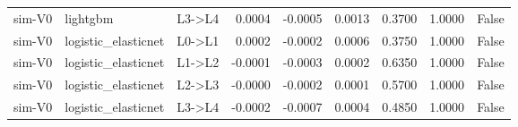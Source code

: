 \begin{table}
\begin{tabular}{lllrrrrrr}
sim-V0 & lightgbm & L3->L4 & 0.0004 & -0.0005 & 0.0013 & 0.3700 & 1.0000 & False \\
sim-V0 & logistic\_elasticnet & L0->L1 & 0.0002 & -0.0002 & 0.0006 & 0.3750 & 1.0000 & False \\
sim-V0 & logistic\_elasticnet & L1->L2 & -0.0001 & -0.0003 & 0.0002 & 0.6350 & 1.0000 & False \\
sim-V0 & logistic\_elasticnet & L2->L3 & -0.0000 & -0.0002 & 0.0001 & 0.5700 & 1.0000 & False \\
sim-V0 & logistic\_elasticnet & L3->L4 & -0.0002 & -0.0007 & 0.0004 & 0.4850 & 1.0000 & False \\
\bottomrule
\end{tabular}
\end{table}
